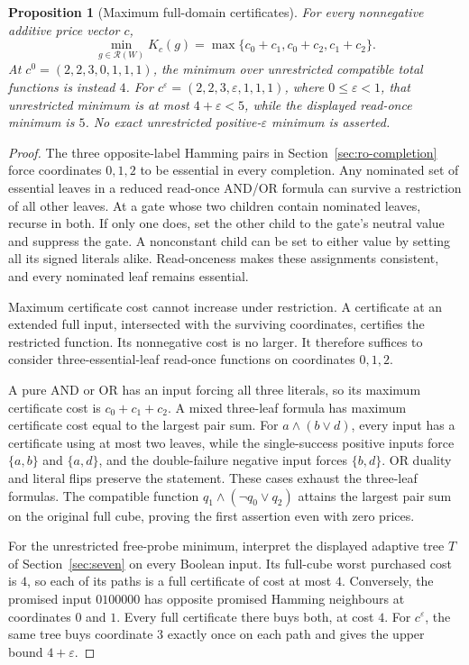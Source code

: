 \documentclass[pdflatex,sn-mathphys-num]{sn-jnl}
\theoremstyle{thmstyleone}
\newtheorem{proposition}[theorem]{Proposition}
\theoremstyle{thmstylethree}
\theoremstyle{thmstyletwo}
\begin{document}
\begin{proposition}[Maximum full-domain certificates]
\label{prop:ro-certificate}
For every nonnegative additive price vector $c$,
\[
 \min_{g\in\mathcal R(W)}K_c(g)
   =\max\{c_0+c_1,c_0+c_2,c_1+c_2\}.
\]
At $c^0=(2,2,3,0,1,1,1)$, the minimum over unrestricted compatible
total functions is instead $4$. For
$c^\varepsilon=(2,2,3,\varepsilon,1,1,1)$, where
$0\leq\varepsilon<1$, that unrestricted minimum is at most
$4+\varepsilon<5$, while the displayed read-once minimum is $5$.
No exact unrestricted positive-$\varepsilon$ minimum is asserted.
\end{proposition}

\begin{proof}
The three opposite-label Hamming pairs in
Section~\ref{sec:ro-completion} force coordinates $0,1,2$ to be
essential in every completion. Any nominated set of essential leaves
in a reduced read-once AND/OR formula can survive a restriction of all
other leaves. At a gate whose two children contain nominated leaves,
recurse in both. If only one does, set the other child to the gate's
neutral value and suppress the gate. A nonconstant child can be set
to either value by setting all its signed literals alike. Read-onceness
makes these assignments consistent, and every nominated leaf remains
essential.

Maximum certificate cost cannot increase under restriction. A
certificate at an extended full input, intersected with the surviving
coordinates, certifies the restricted function. Its nonnegative cost
is no larger. It therefore suffices to consider three-essential-leaf
read-once functions on coordinates $0,1,2$.

A pure AND or OR has an input forcing all three literals, so its
maximum certificate cost is $c_0+c_1+c_2$. A mixed three-leaf formula
has maximum certificate cost equal to the largest pair sum. For
$a\land(b\lor d)$, every input has a certificate using at most two
leaves, while the single-success positive inputs force $\{a,b\}$
and $\{a,d\}$, and the double-failure negative input forces
$\{b,d\}$. OR duality and literal flips preserve the statement.
These cases exhaust the three-leaf formulas. The compatible function
$q_1\land(\neg q_0\lor q_2)$ attains the largest pair sum on the
original full cube, proving the first assertion even with zero prices.

For the unrestricted free-probe minimum, interpret the displayed
adaptive tree $T$ of Section~\ref{sec:seven} on every Boolean input.
Its full-cube worst purchased cost is $4$, so each of its paths is a
full certificate of cost at most $4$. Conversely, the promised input
$0100000$ has opposite promised Hamming neighbours at coordinates
$0$ and $1$. Every full certificate there buys both, at cost $4$.
For $c^\varepsilon$, the same tree buys coordinate $3$ exactly once
on each path and gives the upper bound $4+\varepsilon$.
\end{proof}
\end{document}
